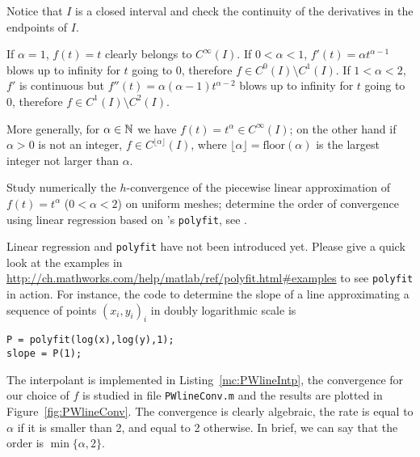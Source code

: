 \begin{problem}
\begin{subproblem}[2]
\begin{hint}
Notice that $I$ is a closed interval and check the continuity of the derivatives in the endpoints of $I$.
\end{hint}

\begin{solution}
If $\alpha=1$, $f(t)=t$ clearly belongs to $C^\infty(I)$.
If $0<\alpha<1$, $f'(t)=\alpha t^{\alpha-1}$ blows up to infinity for $t$ going to $0$, therefore $f\in C^0(I)\setminus C^1(I)$.
If $1<\alpha<2$, $f'$ is continuous but $f''(t)=\alpha(\alpha-1) t^{\alpha-2}$ blows up to infinity for $t$ going to $0$, 
therefore $f\in C^1(I)\setminus C^2(I)$.

More generally, for $\alpha\in \mathbb{N}$ we have $f(t)=t^\alpha\in C^\infty(I)$; on the other hand if $\alpha>0$ is not an integer, $f\in C^{\lfloor \alpha\rfloor}(I)$, where $\lfloor \alpha\rfloor =\mathrm{floor}(\alpha) $ is the largest integer not larger than $\alpha$.
\end{solution}
\end{subproblem}






\begin{subproblem}[3]\label{subprb:GradedMeshes_2half}
Study numerically the $h$-convergence of the piecewise linear approximation of
$f(t)=t^\alpha$ ($0<\alpha<2$) on uniform meshes; determine the order of
convergence using linear regression based on \Matlab's \texttt{polyfit}, see
.

\begin{hint}
Linear regression and \texttt{polyfit} have not been introduced yet. Please give a quick look at the examples in \href{http://ch.mathworks.com/help/matlab/ref/polyfit.html\#examples}{http://ch.mathworks.com/help/matlab/ref/polyfit.html\#examples} to see \texttt{polyfit} in action. For instance, the code to determine the slope of a line approximating a sequence of points $(x_i,y_i)_i$ in doubly logarithmic scale is
\begin{lstlisting}
P = polyfit(log(x),log(y),1);
slope = P(1);
\end{lstlisting}
\end{hint}

\begin{solution}The interpolant is implemented in Listing~\ref{mc:PWlineIntp}, the convergence for our choice of $f$ is studied in file \texttt{PWlineConv.m} and the results are plotted in Figure~\ref{fig:PWlineConv}.
The convergence is clearly algebraic, the rate is equal to $\alpha$ if it is smaller than 2, and equal to 2 otherwise.
In  brief, we can say that the order is $\min\{\alpha,2\}$.


\end{solution}
\end{subproblem}
\end{problem}
